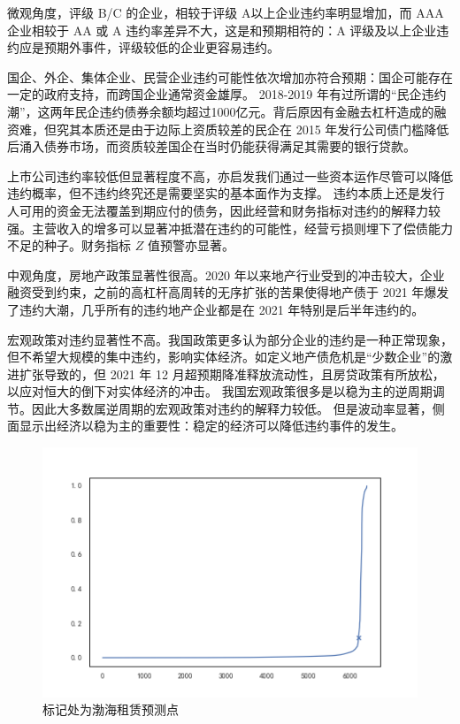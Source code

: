 
微观角度，评级 B/C 的企业，相较于评级 A以上企业违约率明显增加，而 AAA 企业相较于 AA 或 A 违约率差异不大，这是和预期相符的：A 评级及以上企业违约应是预期外事件，评级较低的企业更容易违约。

国企、外企、集体企业、民营企业违约可能性依次增加亦符合预期：国企可能存在一定的政府支持\autocite{mo2021china}，而跨国企业通常资金雄厚。
2018-2019 年有过所谓的“民企违约潮”，这两年民企违约债券余额均超过1000亿元。背后原因有金融去杠杆造成的融资难，但究其本质还是由于边际上资质较差的民企在 2015 年发行公司债门槛降低后涌入债券市场，而资质较差国企在当时仍能获得满足其需要的银行贷款。

上市公司违约率较低但显著程度不高，亦启发我们通过一些资本运作尽管可以降低违约概率，但不违约终究还是需要坚实的基本面作为支撑。
违约本质上还是发行人可用的资金无法覆盖到期应付的债务，因此经营和财务指标对违约的解释力较强。主营收入的增多可以显著冲抵潜在违约的可能性，经营亏损则埋下了偿债能力不足的种子。财务指标 \(Z\) 值预警亦显著。

中观角度，房地产政策显著性很高。2020 年以来地产行业受到的冲击较大，企业融资受到约束，之前的高杠杆高周转的无序扩张的苦果使得地产债于 2021 年爆发了违约大潮，几乎所有的违约地产企业都是在 2021 年特别是后半年违约的。

宏观政策对违约显著性不高。我国政策更多认为部分企业的违约是一种正常现象，但不希望大规模的集中违约，影响实体经济。如定义地产债危机是“少数企业”的激进扩张导致的，但 2021 年 12 月超预期降准释放流动性，且房贷政策有所放松，以应对恒大的倒下对实体经济的冲击。
我国宏观政策很多是以稳为主的逆周期调节。因此大多数属逆周期的宏观政策对违约的解释力较低。
但是波动率显著，侧面显示出经济以稳为主的重要性：稳定的经济可以降低违约事件的发生。
\begin{figure}[h]
	\centering
	\includegraphics[width=0.9\linewidth]{./data/渤海银行.png}
	\caption{标记处为渤海租赁预测点}
	\label{fig:bhyh}
\end{figure}

